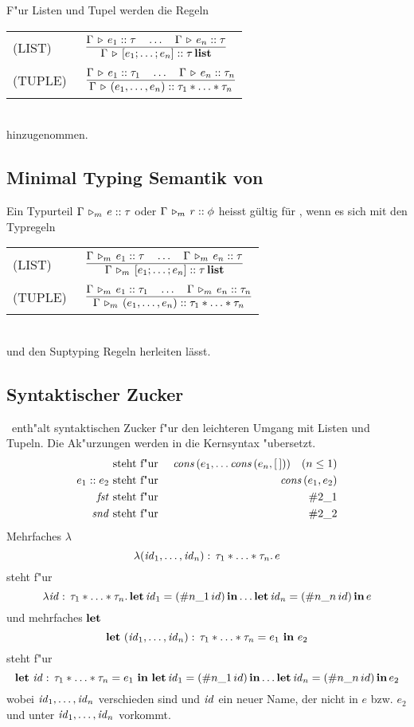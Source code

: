 F"ur Listen und Tupel werden die Regeln\\[3mm]
\begin{tabular}{ll}
  \mbox{(LIST)\ } & $\regel{\Tj{\Gamma}{e_1}{\tau} \quad \ldots \quad \Tj{\Gamma}{e_n}{\tau}}
                           {\Tj{\Gamma}{[e_1;\ldots;e_n]}{\listtype{\tau}}}$ \\[5mm]
  \mbox{(TUPLE)\ }& $\regel{\Tj{\Gamma}{e_1}{\tau_1} \quad \ldots \quad \Tj{\Gamma}{e_n}{\tau_n}}
                           {\Tj{\Gamma}{(e_1,\ldots,e_n)}{\tau_1 * \ldots * \tau_n}}$
\end{tabular}\\[7mm]
hinzugenommen.


\subsection{Minimal Typing Semantik von \LTHREE}

  Ein Typurteil $\Gamma\,\triangleright_m\,e\mathrel{::}\tau$ oder $\Gamma\,\triangleright_m\,r\mathrel{::}\phi$ heisst g\"ultig f\"ur \Lom,
  wenn es sich mit den  Typregeln \\[5mm]

     \begin{tabular}{ll}
  \mbox{(LIST)\ } & $\regel{\Tjm{\Gamma}{e_1}{\tau} \quad \ldots \quad \Tjm{\Gamma}{e_n}{\tau}}
                           {\Tjm{\Gamma}{[e_1;\ldots;e_n]}{\listtype{\tau}}}$ \\[5mm]
  \mbox{(TUPLE)\ }& $\regel{\Tjm{\Gamma}{e_1}{\tau_1} \quad \ldots \quad \Tjm{\Gamma}{e_n}{\tau_n}}
                           {\Tjm{\Gamma}{(e_1,\ldots,e_n)}{\tau_1 * \ldots * \tau_n}}$
  \end{tabular} \\[7mm]
  und den Suptyping Regeln herleiten l\"asst.

\subsection{Syntaktischer Zucker}

\LTHREE\ enth"alt syntaktischen Zucker f"ur den leichteren Umgang mit Listen und Tupeln. Die Ak"urzungen werden
in die Kernsyntax "ubersetzt.
\begin{eqnarray*}
  [e_1;\ldots;e_n]    & \mbox{ steht f"ur } & \Cons\,(e_1,\ldots \Cons\,(e_n, [\,])) \quad (n \le 1) \\
  e_1 \coloncolon e_2 & \mbox{ steht f"ur } & \Cons\,(e_1, e_2) \\
  \Fst                & \mbox{ steht f"ur } & \#2\_1 \\
  \Snd                & \mbox{ steht f"ur } & \#2\_2
\end{eqnarray*}
Mehrfaches $\lambda$
\[
  \lambda({\text{\it id\/}}_1,\ldots,{\text{\it id\/}}_n):\,\tau_1 * \ldots * \tau_n.\,e
\]
steht f"ur
\[
  \lambda {\text{\it id\/}}:\,\tau_1 * \ldots * \tau_n.\,\textbf{let}\,{\text{\it id\/}}_1 = (\#n\_1\,id)\,\textbf{in} \ldots \textbf{let}\,{\text{\it id\/}}_n = (\#n\_n\,id)\,\textbf{in}\,e
\]
und mehrfaches $\textbf{let}$
\[
  \textbf{let}\ ({\text{\it id\/}}_1,\ldots,{\text{\it id\/}}_n):\,\tau_1 * \ldots * \tau_n = e_1\ \textbf{in}\ e_2
\]
steht f"ur
\[
  \textbf{let}\ {\text{\it id\/}}:\,\tau_1 * \ldots * \tau_n = e_1\ \textbf{in}\ \textbf{let}\,{\text{\it id\/}}_1 = (\#n\_1\,id)\,\textbf{in} \ldots \textbf{let}\,{\text{\it id\/}}_n = (\#n\_n\,id)\,\textbf{in}\,e_2
\]
wobei ${\text{\it id\/}}_1,\ldots,{\text{\it id\/}}_n$ verschieden sind und ${\text{\it id\/}}$ ein neuer Name, der nicht in $e$ bzw. $e_2$ und unter ${\text{\it id\/}}_1,\ldots,{\text{\it id\/}}_n$
vorkommt.

